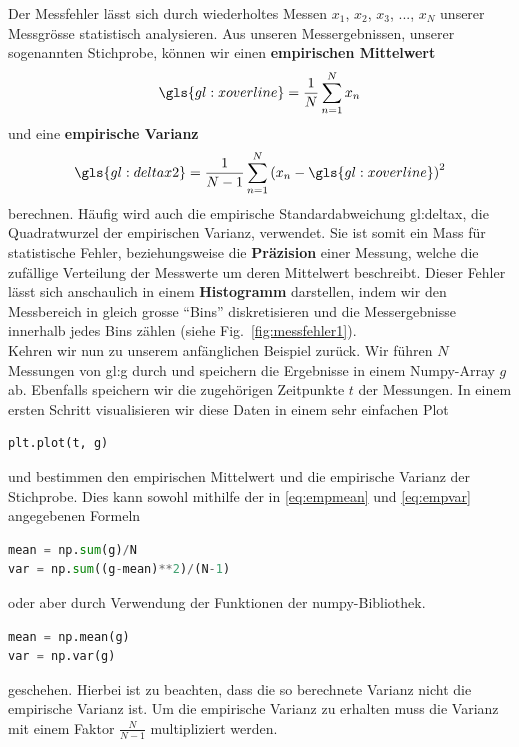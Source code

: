 Der Messfehler lässt sich durch wiederholtes Messen $x_1$, $x_2$, $x_3$, ..., $x_N$  unserer Messgrösse statistisch analysieren. Aus unseren Messergebnissen, unserer sogenannten Stichprobe, können wir einen  \textbf{empirischen Mittelwert}
\begin{align}
\gls{gl:xoverline} = \frac{1}{N} \sum^N_{n = 1} x_n
\label{eq:empmean}
\end{align}
und eine \textbf{empirische Varianz}
\begin{align}
\gls{gl:deltax2}  = \frac{1}{N-1} \sum^N_{n = 1} \left( x_n - \gls{gl:xoverline} \right) ^2
\label{eq:empvar}
\end{align}
berechnen. Häufig wird auch die empirische Standardabweichung \gls{gl:deltax}, die Quadratwurzel der empirischen Varianz, verwendet. Sie ist somit ein Mass für statistische Fehler, beziehungsweise die \textbf{Präzision} einer Messung, welche die zufällige Verteilung der Messwerte um deren Mittelwert beschreibt. Dieser Fehler lässt sich anschaulich in einem \textbf{Histogramm} darstellen, indem wir den Messbereich in gleich grosse ``Bins'' diskretisieren und die Messergebnisse innerhalb jedes Bins zählen (siehe Fig.~\ref{fig:messfehler1}).   \\

Kehren wir nun zu unserem anfänglichen Beispiel zurück. Wir führen $N$ Messungen von \gls{gl:g} durch und speichern die Ergebnisse in einem Numpy-Array $g$ ab. Ebenfalls speichern wir die zugehörigen Zeitpunkte $t$ der Messungen. In einem ersten Schritt visualisieren wir diese Daten in einem sehr einfachen Plot
\begin{lstlisting}[language = Python]
plt.plot(t, g)
\end{lstlisting}
und bestimmen den empirischen Mittelwert und die empirische Varianz der Stichprobe. Dies kann sowohl mithilfe der in \ref{eq:empmean} und \ref{eq:empvar} angegebenen Formeln   
\begin{lstlisting}[language = Python]
mean = np.sum(g)/N
var = np.sum((g-mean)**2)/(N-1)
\end{lstlisting}
oder aber durch Verwendung der Funktionen der numpy-Bibliothek. 
\begin{lstlisting}[language = Python]
mean = np.mean(g)
var = np.var(g)
\end{lstlisting}
geschehen. Hierbei ist zu beachten, dass die so berechnete Varianz nicht die empirische Varianz ist. Um die empirische Varianz zu erhalten muss die Varianz mit einem Faktor $\frac{N}{N-1}$ multipliziert werden.\\

